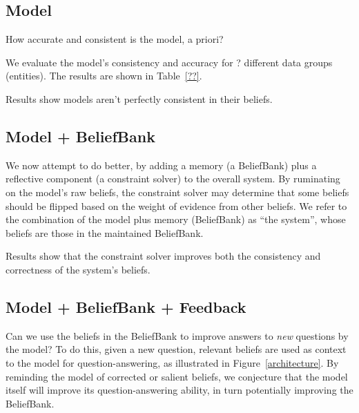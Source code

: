 \documentclass[11pt]{article}
\begin{document}
\subsection{Model}

How accurate and consistent is the model, a priori?

We evaluate the model's consistency and accuracy for ? different data groups (entities). The results are shown in Table~\ref{??}.

Results show models aren't perfectly consistent in their beliefs.

\subsection{Model + BeliefBank}


We now attempt to do better, by adding a memory (a BeliefBank) plus a reflective component (a constraint solver)
to the overall system. By ruminating on the model's raw beliefs, the constraint solver may determine
that some beliefs should be flipped based on the weight of evidence from other beliefs. We refer
to the combination of the model plus memory (BeliefBank) as ``the system'', whose beliefs are those
in the maintained BeliefBank.

Results show that the constraint solver improves both the consistency and correctness
of the system's beliefs.


\subsection{Model + BeliefBank + Feedback}

Can we use the beliefs in the BeliefBank to improve answers to {\it new} questions by the model?
To do this, given a new question, relevant beliefs are used as 
context to the model for question-answering, as illustrated in Figure~\ref{architecture}. 
By reminding the model of corrected or salient beliefs, we conjecture that the model itself
will improve its question-answering ability, in turn potentially improving the
BeliefBank.
\end{document}
